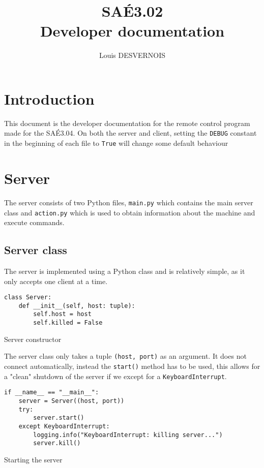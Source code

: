 \documentclass{article}
\author{Louis DESVERNOIS}
\title{%
    SAÉ3.02 \\
    \large Developer documentation}
\begin{document}
\maketitle
\tableofcontents
\listoflistings

\newpage
\section{Introduction}
This document is the developer documentation for the remote control program made
for the SAÉ3.04. On both the server and client, setting the \verb|DEBUG|
constant in the beginning of each file to \verb|True| will change some default behaviour 

\section{Server}
The server consists of two Python files, \verb|main.py| which contains the main
server class and \verb|action.py| which is used to obtain information about the
machine and execute commands.

\subsection{Server class}
The server is implemented using a Python class and is relatively simple, as it
only accepts one client at a time.

\begin{listing}[H]
    \begin{verbatim}
class Server:
    def __init__(self, host: tuple):
        self.host = host
        self.killed = False
    \end{verbatim}
    \caption{Server constructor}
    \label{serv:init}
\end{listing}

The server class only takes a tuple \verb|(host, port)| as an argument. It does
not connect automatically, instead the \verb|start()| method has to be used,
this allows for a "clean" shutdown of the server if we except for a
\verb|KeyboardInterrupt|.

\begin{listing}[H]
    \begin{verbatim}
if __name__ == "__main__":
    server = Server((host, port))
    try:
        server.start()
    except KeyboardInterrupt:
        logging.info("KeyboardInterrupt: killing server...")
        server.kill()
    \end{verbatim}
    \caption{Starting the server}
    \label{serv:start}
\end{listing}
\end{document}

